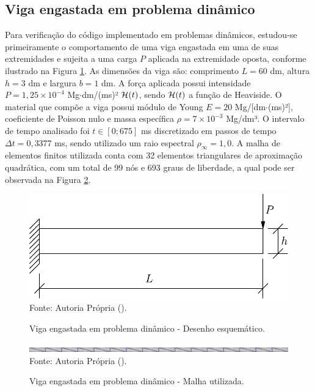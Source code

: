 \subsection{Viga engastada em problema dinâmico} \label{Ap:DinBeam}

Para verificação do código implementado em problemas dinâmicos, estudou-se  primeiramente o comportamento de uma viga engastada em uma de suas extremidades e sujeita a uma carga $P$ aplicada na extremidade oposta, conforme ilustrado na Figura \ref{fig:viga1}. As dimensões da viga são: comprimento $L=60$ dm, altura $h=3$ dm e largura $b=1$ dm. A força aplicada possui intensidade $P=1,25\times10^{-4}$ Mg$\cdot$dm/(ms)² $\mathcal{H}(t)$, sendo $\mathcal{H}(t)$ a função de Heaviside. O material que compõe a viga possui módulo de Young $E=20$ Mg/[dm$\cdot$(ms)²], coeficiente de Poisson nulo e massa específica $\rho=7\times10^{-3}$ Mg/dm³. O intervalo de tempo analisado foi $t\in[0;675]$ ms discretizado em passos de tempo $\Delta t=0,3377$ ms, sendo utilizado um raio espectral $\rho_\infty=1,0$. A malha de elementos finitos utilizada conta com 32 elementos triangulares de aproximação quadrática, com um total de 99 nós e 693 graus de liberdade, a qual pode ser observada na Figura \ref{fig:viga1-mesh}.

\begin{figure}[h!]
    \centering
    \caption{Viga engastada em problema dinâmico - Desenho esquemático.}
    \includegraphics[width=0.5\linewidth]{Figuras/vigas/viga1.pdf}
    \\Fonte: Autoria Própria (\the\year).
    \label{fig:viga1}
\end{figure}

\begin{figure}[h!]
    \centering
    \caption{Viga engastada em problema dinâmico - Malha utilizada.}
    \includegraphics[width=\linewidth]{Figuras/vigas/mesh1.png}
    \\Fonte: Autoria Própria (\the\year).
    \label{fig:viga1-mesh}
\end{figure}


